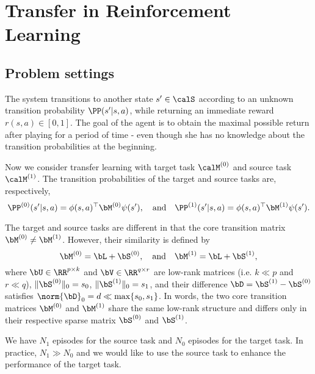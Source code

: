 \section{Transfer in Reinforcement Learning} 

\subsection{Problem settings}


The system transitions to another state $s' \in \calS$ according to an unknown transition probability $\PP(s' | s, a)$, while returning an immediate reward $r(s, a)\in [0, 1]$. 
The goal of the agent is to obtain the maximal
possible return after playing for a period of time - even though she has no knowledge about the
transition probabilities at the beginning.



Now we consider transfer learning with target task $\calM^{(0)}$ and source task $\calM^{(1)}$. 
The transition probabilities of the target and source tasks are, respectively,
\begin{equation*}
    \PP^{(0)}(s' | s, a) = \phi(s, a)^\top \bM^{(0)} \psi(s'), \quad\text{and}\quad
    \PP^{(1)}(s' | s, a) = \phi(s, a)^\top\bM^{(1)}  \psi(s').
\end{equation*}

The target and source tasks are different in that the core transition matrix $\bM^{(0)} \ne \bM^{(1)}$. 
However, their similarity is defined by \begin{equation}
    \bM^{(0)} = \bL + \bS^{(0)}, 
    \quad\text{and}\quad
    \bM^{(1)} = \bL + \bS^{(1)},
\end{equation}
where $\bU \in \RR^{p \times k}$ and $\bV \in \RR^{q \times r}$ are low-rank matrices (i.e. $k\ll p$ and $r\ll q$), $\lVert \bS^{(0)} \rVert_0 = s_0$,  $\lVert \bS^{(1)} \rVert_0 = s_1$, and their difference $\bD = \bS^{(1)} - \bS^{(0)}$ satisfies $\norm{\bD}_0 = d \ll \max\{s_0, s_1\}$.
In words, the two core transition matrices $\bM^{(0)}$ and  $\bM^{(1)}$ share the same low-rank structure and differs only in their respective sparse matrix $\bS^{(0)}$ and $\bS^{(1)}$. 

We have $N_1$ episodes for the source task and $N_0$ episodes for the target task. 
In practice, $N_1 \gg N_0$ and we would like to use the source task to enhance the performance of the target task. 

